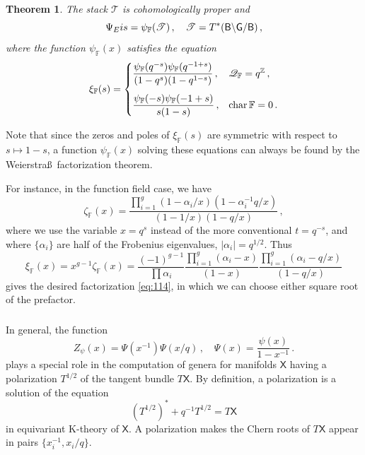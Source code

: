 \documentclass[14pt]{extarticle}
\newcommand{\cz}{\textup{\small \cursive z}}
\newcommand{\Q}{\mathbb{Q}}
\newcommand{\F}{\mathbb{F}}
\newcommand{\Z}{\mathbb{Z}}
\newcommand{\bG}{\mathsf{G}}
\newcommand{\bB}{\mathsf{B}}
\newcommand{\bX}{\mathsf{X}}
\newcommand{\cT}{\mathscr{T}}
\newcommand{\cQ}{\mathscr{Q}}
\DeclareMathOperator{\chr}{char}
\newcommand{\Eis}{\textup{Eis}}
\newtheorem{Theorem}{Theorem}
\theoremstyle{definition}
\begin{document}
\begin{Theorem}\label{t_T3} 
  The stack $\cT$ is cohomologically proper and 
  \begin{equation}
  \Psi_\Eis =\psi_\F(\cT) \,, \quad \cT = T^*( \bB \backslash \bG
  /\bB)\,, 
\label{eq:68}
\end{equation}
% 
  where the function $\psi_\F(x)$ satisfies the equation
  \begin{equation}
  \xi_\F(s) = \begin{cases}
  \dfrac{\psi_\F(q^{-s}) \psi_\F(q^{-1+s})}{(1-q^s)(1-q^{1-s})} \,,
  &\cQ_\F = q^\Z \,, \vspace{3mm}\\ 
 \dfrac{\psi_\F(-s) \psi_\F(-1+s)}{s(1-s)} \,, & \chr \F = 0 \,. 
\end{cases}\label{eq:108}
\end{equation}
%
\end{Theorem}

\noindent
Note that since the zeros and poles of $\xi_\F(s)$ are symmetric with
respect to $s \mapsto 1-s$, a function $\psi_\F(x)$ solving these
equations can always be found by the Weierstra\ss\ factorization
theorem.

For instance, in the function field case, we have
%
\begin{equation}
  \zeta_\F(x) = \frac{\prod_{i=1}^{g} (1- \alpha_i/ x) (1-
    \alpha_i^{-1} q / x)}
  {(1-1/x)(1-q/x)}\,,
\label{eq:159}
\end{equation}
%
where we use the variable $x=q^{s}$ instead of the more conventional
$t=q^{-s}$, and where $\{\alpha_i\}$ are half of the Frobenius
eigenvalues, $|\alpha_i|=q^{1/2}$. Thus
%
\begin{equation}
  \label{eq:161}
  \xi_\F(x) = x^{g-1} \zeta_\F(x) = \frac{(-1)^{g-1}}{\prod \alpha_i} 
  \frac{\prod_{i=1}^{g} (\alpha_i - x     
    ) }{(1-x)}
  \frac{\prod_{i=1}^{g} (\alpha_i - q/x) }{(1-q/x)} 
\end{equation}
%
gives the desired factorization \eqref{eq:114}, in which we can
choose either square root of the prefactor. 

\subsubsection{}



In general, the function
%
\begin{equation}
  \label{eq:114}
Z_\psi(x) = \Psi(x^{-1}) \Psi(x/q) \,, \quad \Psi(x) = \frac{\psi(x)}{1-x^{-1}} \,.
\end{equation}
%
plays a special role in the computation of genera for manifolds $\bX$ having
a polarization $T^{1/2}$ of the tangent bundle $T\bX$. By definition, a
polarization is a solution of the equation
\[
  (T^{1/2})^* + q^{-1} T^{1/2} = T\bX
\]
in equivariant K-theory of $\bX$. A polarization makes the Chern roots
of $T\bX$ appear in pairs $\{x_i^{-1}, x_i/q\}$.
\end{document}
